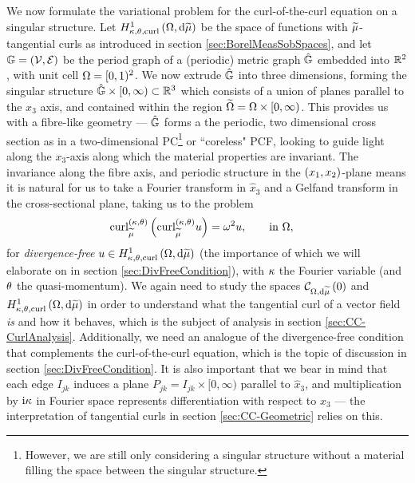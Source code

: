 We now formulate the variational problem for the curl-of-the-curl equation on a singular structure.
Let $H^1_{\kappa,\theta,\mathrm{curl}}\left( \Omega, \mathrm{d}\widetilde{\mu} \right)$ be the space of functions with $\widetilde{\mu}$-tangential curls as introduced in section \ref{sec:BorelMeasSobSpaces}, and let $\mathbb{G}=\left( \mathcal{V},\mathcal{E} \right)$ be the period graph of a (periodic) metric graph $\hat{\mathbb{G}}$ embedded into $\mathbb{R}^2$, with unit cell $\Omega=[0,1)^2$.
We now extrude $\hat{\mathbb{G}}$ into three dimensions, forming the singular structure $\hat{\mathbb{G}}\times[0,\infty)\subset\mathbb{R}^3$ which consists of a union of planes parallel to the $x_3$ axis, and contained within the region $\widetilde{\Omega}=\Omega\times[0,\infty)$.
This provides us with a fibre-like geometry --- $\hat{\mathbb{G}}$ forms a the periodic, two dimensional cross section as in a two-dimensional PC\footnote{However, we are still only considering a singular structure without a material filling the space between the singular structure.} or ``coreless" PCF, looking to guide light along the $x_3$-axis along which the material properties are invariant.
The invariance along the fibre axis, and periodic structure in the $\left( x_1,x_2 \right)$-plane means it is natural for us to take a Fourier transform in $\widehat{x}_3$ and a Gelfand transform in the cross-sectional plane, taking us to the problem
\begin{align} \label{eq:SingularCurlEquation}
	\mathrm{curl}_{\widetilde{\mu}}^{\left( \kappa, \theta \right)}\left(  \mathrm{curl}_{\widetilde{\mu}}^{\left( \kappa, \theta \right)}u  \right) &= \omega^2 u,
	\qquad \text{in } \Omega,
\end{align}
for \emph{divergence-free} $u\in H^1_{\kappa,\theta,\mathrm{curl}}\left( \Omega, \mathrm{d}\widetilde{\mu} \right)$ (the importance of which we will elaborate on in section \ref{sec:DivFreeCondition}), with $\kappa$ the Fourier variable (and $\theta$ the quasi-momentum).
We again need to study the spaces $\mathcal{C}_{ \Omega, \mathrm{d}\widetilde{\mu}}\left( 0 \right)$ and $H^1_{\kappa,\theta,\mathrm{curl}}\left( \Omega, \mathrm{d}\widetilde{\mu} \right)$ in order to understand what the tangential curl of a vector field \emph{is} and how it behaves, which is the subject of analysis in section \ref{sec:CC-CurlAnalysis}.
Additionally, we need an analogue of the divergence-free condition that complements the curl-of-the-curl equation, which is the topic of discussion in section \ref{sec:DivFreeCondition}.
It is also important that we bear in mind that each edge $I_{jk}$ induces a plane $P_{jk} = I_{jk}\times[0,\infty)$ parallel to $\widehat{x}_3$, and multiplication by $\mathrm{i}\kappa$ in Fourier space represents differentiation with respect to $x_3$ --- the interpretation of tangential curls in section \ref{sec:CC-Geometric} relies on this.

